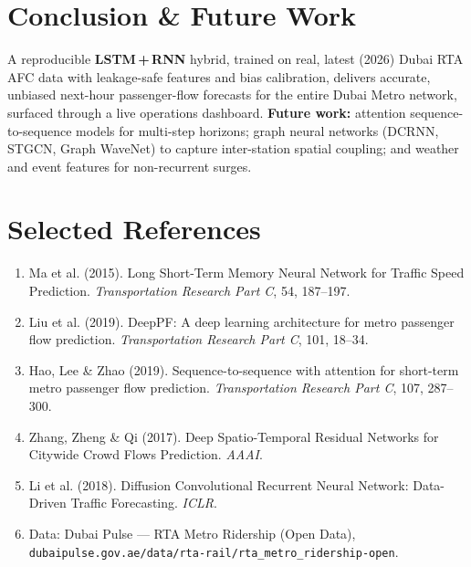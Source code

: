 \documentclass[11pt]{article}
\begin{document}
\section{Conclusion \& Future Work}
A reproducible \textbf{LSTM\,+\,RNN} hybrid, trained on real, latest (2026) Dubai RTA AFC data with
leakage-safe features and bias calibration, delivers accurate, unbiased next-hour passenger-flow
forecasts for the entire Dubai Metro network, surfaced through a live operations dashboard.
\textbf{Future work:} attention sequence-to-sequence models for multi-step horizons; graph neural
networks (DCRNN, STGCN, Graph WaveNet) to capture inter-station spatial coupling; and weather and
event features for non-recurrent surges.

\section*{Selected References}
\small
\begin{enumerate}
  \item Ma et al. (2015). Long Short-Term Memory Neural Network for Traffic Speed Prediction.
        \emph{Transportation Research Part C}, 54, 187--197.
  \item Liu et al. (2019). DeepPF: A deep learning architecture for metro passenger flow prediction.
        \emph{Transportation Research Part C}, 101, 18--34.
  \item Hao, Lee \& Zhao (2019). Sequence-to-sequence with attention for short-term metro passenger
        flow prediction. \emph{Transportation Research Part C}, 107, 287--300.
  \item Zhang, Zheng \& Qi (2017). Deep Spatio-Temporal Residual Networks for Citywide Crowd Flows
        Prediction. \emph{AAAI}.
  \item Li et al. (2018). Diffusion Convolutional Recurrent Neural Network: Data-Driven Traffic
        Forecasting. \emph{ICLR}.
  \item Data: Dubai Pulse --- RTA Metro Ridership (Open Data),
        \texttt{dubaipulse.gov.ae/data/rta-rail/rta\_metro\_ridership-open}.
\end{enumerate}
\end{document}
